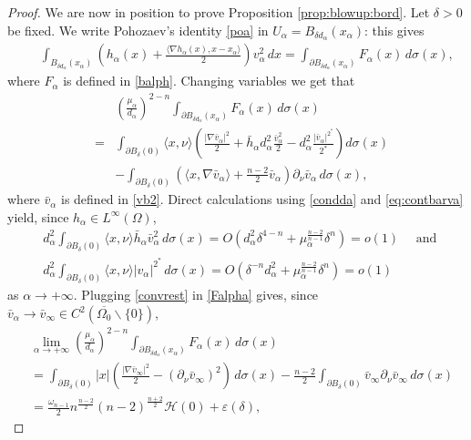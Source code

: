 \documentclass[10pt]{amsart}
\numberwithin{equation}{section}
\newcommand{\ve}{\varepsilon}
\newcommand{\Om}{\Omega}
\newcommand{\ma}{\mu_\alpha}
\def \xl{x_\alpha}
\def \vb{\bar{v}_{\alpha}}
\def \ma{\mu_{\alpha}}
\def \va{v_{\alpha}}
\def \ha{h_{\alpha}}
\def \r {\rangle}
\def \l{\langle}
\def \h{\mathcal{H}}
\def \da{d_{\alpha}}
\def \lal{\lim_{\alpha\to +\infty}}
\def \hb{\bar{h}_{\alpha}}
\def \vbi{\bar{v}_{\infty}}
\theoremstyle{plain}
\theoremstyle{remark}
\begin{document}
\begin{proof}
We are now in position to prove Proposition \ref{prop:blowup:bord}. Let $\delta >0$ be fixed. We write Pohozaev's identity \eqref{poa} in $U_\alpha = B_{\delta d_\alpha}(x_\alpha)$: this gives 
\begin{eqnarray}\label{poa3}
	&&\int_{B_{\delta\da}(\xl)}\left(\ha(x)+\frac{\l\nabla \ha(x),x-\xl \r}{2} \right)  \va^2\, dx =\int_{\partial B_{\delta\da}(\xl)}  F_{\alpha}(x) \,  d\sigma(x),
\end{eqnarray}
where $F_{\alpha}$ is defined in \eqref{balph}. Changing variables we get that 
\begin{eqnarray}\label{Falpha}
	&&\left( \frac{\ma}{\da}\right)^{2-n} \int_{\partial B_{\delta\da}(\xl)}  F_{\alpha}(x) \,  d\sigma(x)\nonumber\\
	&=&\int_{\partial B_{\delta}(0)}\l x, \nu\r\left(  \frac{|\nabla \vb|^2}{2}+\hb \da^2 \frac{\vb^2}{2}-\da^2\frac{|\vb|^{2^*}}{2^*}\right)d\sigma(x)\\
	&&-\int_{\partial B_{\delta}(0)}\left( \l x, \nabla \vb \r+\frac{n-2}{2}\vb \right)\partial_{\nu}\vb \, d\sigma(x),\nonumber
\end{eqnarray}
where $\vb$ is defined in \eqref{vb2}. 
Direct calculations using \eqref{condda} and \eqref{eq:contbarva} yield, since $\ha\in L^{\infty}(\Om)$,
\begin{equation} \label{convrest}
\begin{aligned}
	& \da^2	\int_{\partial B_{\delta}(0)} \l x, \nu\r\hb\vb^2\, d\sigma(x)=O\left(\da^2\delta^{4-n}+\ma^{\frac{n-2}{n-1}}\delta^n\right) = o(1) \quad \text{ and } \\
	& \da^2\int_{\partial B_{\delta}(0)} \l x, \nu\r|\va|^{2^*}\, d\sigma(x)=O\left(\delta^{-n}\da^2+\ma^{\frac{n-2}{n-1}}\delta^n \right) = o(1)
	\end{aligned}
\end{equation}
as $\alpha \to + \infty$. Plugging \eqref{convrest} in  \eqref{Falpha} gives, since $\vb \to \bar{v}_{\infty}\in C^2(\overline{\Om_0} \backslash \{0\})$,
\begin{equation}\label{partfa}
\begin{aligned}
&	\lal \left( \frac{\ma}{\da}\right)^{2-n} \int_{\partial B_{\delta\da}(\xl)}  F_{\alpha}(x) \,  d\sigma(x)\\
	&=\int_{\partial B_{\delta}(0)}|x|\left(  \frac{|\nabla \vbi|^2}{2}-(\partial_{\nu}\vbi)^2\right)\, d\sigma(x)-\frac{n-2}{2}\int_{\partial B_{\delta}(0)} \vbi\partial_{\nu}\vbi\, d\sigma(x)\\
	&=\frac{\omega_{n-1}}{2} n^{\frac{n-2}{2}} (n-2)^{\frac{n+2}{2}} \h(0)+\ve(\delta),

\end{aligned}
\end{equation}
\end{proof}
\end{document}
